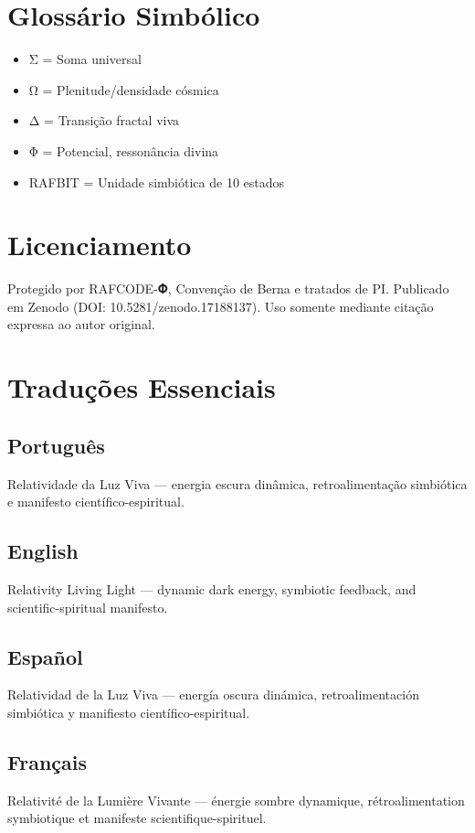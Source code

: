 \documentclass[11pt]{article}
\begin{document}
\section{Glossário Simbólico}
\begin{itemize}
\item Σ = Soma universal  
\item Ω = Plenitude/densidade cósmica  
\item Δ = Transição fractal viva  
\item Φ = Potencial, ressonância divina  
\item RAFBIT = Unidade simbiótica de 10 estados  
\end{itemize}

\section{Licenciamento}
Protegido por RAFCODE-𝚽, Convenção de Berna e tratados de PI.  
Publicado em Zenodo (DOI: 10.5281/zenodo.17188137).  
Uso somente mediante citação expressa ao autor original.  

\section{Traduções Essenciais}
\subsection*{Português}
Relatividade da Luz Viva — energia escura dinâmica, retroalimentação simbiótica e manifesto científico-espiritual.

\subsection*{English}
Relativity Living Light — dynamic dark energy, symbiotic feedback, and scientific-spiritual manifesto.

\subsection*{Español}
Relatividad de la Luz Viva — energía oscura dinámica, retroalimentación simbiótica y manifiesto científico-espiritual.

\subsection*{Français}
Relativité de la Lumière Vivante — énergie sombre dynamique, rétroalimentation symbiotique et manifeste scientifique-spirituel.
\end{document}
